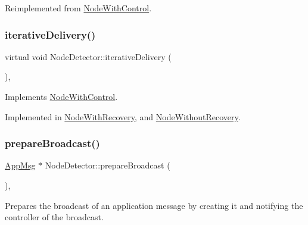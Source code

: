 Reimplemented from \hyperlink{class_node_with_control_a08c8e80fd67b52c51c642d7c66fe729c}{Node\+With\+Control}.

\mbox{\label{class_node_detector_a17ecf9939fce7471f4513b66185743cc}} 
\subsubsection{\texorpdfstring{iterative\+Delivery()}{iterativeDelivery()}}
{\footnotesize\ttfamily virtual void Node\+Detector\+::iterative\+Delivery (\begin{DoxyParamCaption}{ }\end{DoxyParamCaption})\hspace{0.3cm}{\ttfamily [protected]}, {}}



Implements \hyperlink{class_node_with_control_a4f78078272b90937e0746c797443b37d}{Node\+With\+Control}.



Implemented in \hyperlink{class_node_with_recovery_a9b61912f38b62452584dc80bf261ef4e}{Node\+With\+Recovery}, and \hyperlink{class_node_without_recovery_a65e21db6d6b4e72b898fd567f8b4aee2}{Node\+Without\+Recovery}.

\mbox{\label{class_node_detector_af75cf37cc01fc51bc228a7a83c10cb97}} 
\subsubsection{\texorpdfstring{prepare\+Broadcast()}{prepareBroadcast()}}
{\footnotesize\ttfamily \hyperlink{class_app_msg}{App\+Msg} $\ast$ Node\+Detector\+::prepare\+Broadcast (\begin{DoxyParamCaption}{ }\end{DoxyParamCaption})\hspace{0.3cm}{\ttfamily [protected]}, {\ttfamily [virtual]}}



Prepares the broadcast of an application message by creating it and notifying the controller of the broadcast. 

